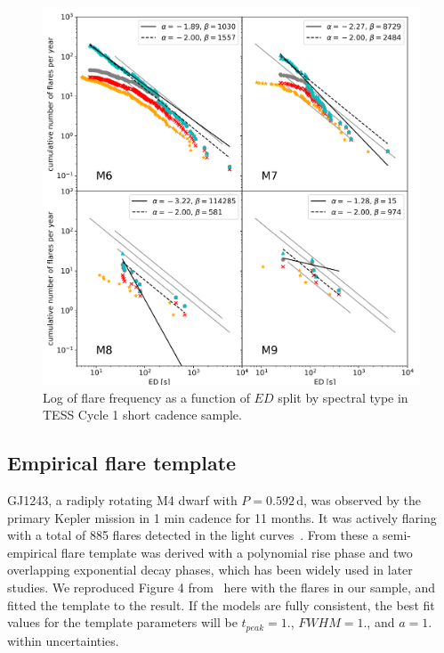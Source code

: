 \documentclass[twocolumn]{aastex62}
\begin{document}
\begin{figure}
	\centering
	\includegraphics[width=1.5\columnwidth]{12_03_2020_14_42_spt_ffds.png}
    \caption{Log of flare frequency as a function of $ED$ split by spectral type in TESS Cycle 1 short cadence sample.}
    \label{fig:ffd_spt_ed}
\end{figure}


\subsection{Empirical flare template}\label{subsec:template}
GJ1243, a radiply rotating M4 dwarf with $P=0.592$\,d, was observed by the primary Kepler mission in 1 min cadence for 11 months. It was actively flaring with a total of 885 flares detected in the light curves~\citep{davenport2014}. From these a semi-empirical flare template was derived with a polynomial rise phase and two overlapping exponential decay phases, which has been widely used in later studies. We reproduced Figure 4 from~\citet{davenport2014} here with the flares in our sample, and fitted the template to the result. If the models are fully consistent, the best fit values for the template parameters will be $t_{peak}=1.$, $FWHM=1.$, and $a=1.$ within uncertainties.
\end{document}

